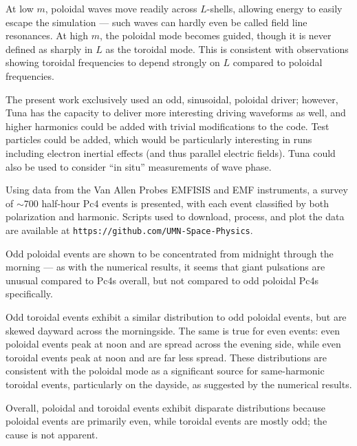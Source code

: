 \documentclass{article}
\newcommand{\about}{\ensuremath{\sim}}
\newcommand{\azm}{\ensuremath{m}\xspace}
\begin{document}
At low \azm, poloidal waves move readily across $L$-shells, allowing energy to easily escape the simulation --- such waves can hardly even be called field line resonances. At high \azm, the poloidal mode becomes guided, though it is never defined as sharply in $L$ as the toroidal mode. This is consistent with observations showing toroidal frequencies to depend strongly on $L$ compared to poloidal frequencies.

The present work exclusively used an odd, sinusoidal, poloidal driver; however, Tuna has the capacity to deliver more interesting driving waveforms as well, and higher harmonics could be added with trivial modifications to the code. Test particles could be added, which would be particularly interesting in runs including electron inertial effects (and thus parallel electric fields). Tuna could also be used to consider ``in situ'' measurements of wave phase.


Using data from the Van Allen Probes EMFISIS and EMF instruments, a survey of \about700 half-hour Pc4 events is presented, with each event classified by both polarization and harmonic. Scripts used to download, process, and plot the data are available at \texttt{https://github.com/UMN-Space-Physics}.

Odd poloidal events are shown to be concentrated from midnight through the morning --- as with the numerical results, it seems that giant pulsations are unusual compared to Pc4s overall, but not compared to odd poloidal Pc4s specifically.

Odd toroidal events exhibit a similar distribution to odd poloidal events, but are skewed dayward across the morningside. The same is true for even events: even poloidal events peak at noon and are spread across the evening side, while even toroidal events peak at noon and are far less spread. These distributions are consistent with the poloidal mode as a significant source for same-harmonic toroidal events, particularly on the dayside, as suggested by the numerical results.

Overall, poloidal and toroidal events exhibit disparate distributions because poloidal events are primarily even, while toroidal events are mostly odd; the cause is not apparent.
\end{document}
